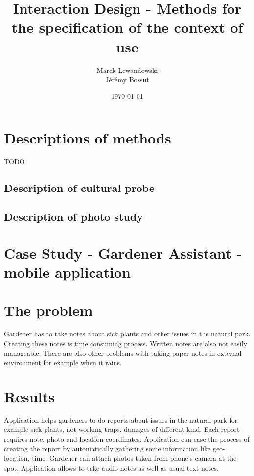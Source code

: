 \documentclass[12pt, a4paper]{article}
\author{Marek Lewandowski \\ Jérémy Bossut}
\date{\today}
\title{Interaction Design - Methods for the specification of the context of use}
\begin{document}
\maketitle
\newpage

\section{Descriptions of methods}

TODO

\subsection{Description of cultural probe}

\subsection{Description of photo study}


\section{Case Study - Gardener Assistant - mobile application}
\section{The problem}
Gardener has to take notes about sick plants and other issues in the natural park. Creating these notes is time consuming process. Written notes are also not easily manageable. There are also other problems with taking paper notes in external environment for example when it rains.

\section{Results}
Application helps gardeners to do reports about issues in the natural park for example sick plants, not working traps, damages of different kind. Each report requires note, photo and location coordinates. Application can ease the process of creating the report by automatically gathering some information like geo-location, time. Gardener can attach photos taken from phone's camera at the spot. Application allows to take audio notes as well as usual text notes.


\nocite{*}


\end{document}

